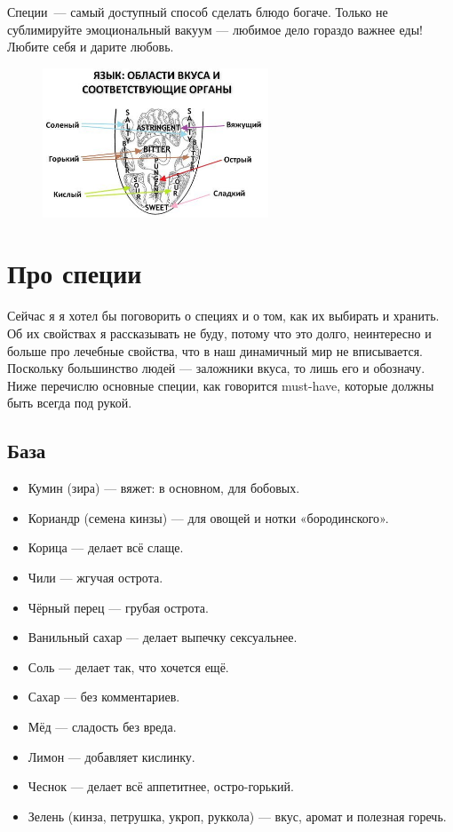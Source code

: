 Специи~--- самый доступный способ сделать блюдо богаче. Только не сублимируйте эмоциональный вакуум — любимое дело гораздо важнее еды! Любите себя и дарите любовь.


\begin{figure}[ht]
    \centering
    \includegraphics[width=0.6\textwidth]{img/SixTastes}
    \label{fig:1}
\end{figure} 

\section{Про специи}
Сейчас я я хотел бы поговорить о специях и о том, как их выбирать и хранить. Об их свойствах я рассказывать не буду, потому что это долго, неинтересно и больше про лечебные свойства, что в наш динамичный мир не вписывается. Поскольку большинство людей — заложники вкуса, то лишь его и обозначу. Ниже перечислю основные специи, как говорится must-have, которые должны быть всегда под рукой.

\subsection{База}
\begin{itemize}
\item Кумин (зира) — вяжет: в основном, для бобовых.
\item Кориандр (семена кинзы) — для овощей и нотки «бородинского».
\item Корица — делает всё слаще.
\item Чили — жгучая острота.
\item Чёрный перец — грубая острота.
\item Ванильный сахар — делает выпечку сексуальнее.
\item Соль — делает так, что хочется ещё.
\item Сахар — без комментариев.
\item Мёд — сладость без вреда.
\item Лимон — добавляет кислинку.
\item Чеснок — делает всё аппетитнее, остро-горький.
\item Зелень (кинза, петрушка, укроп, руккола) — вкус, аромат и полезная горечь.
\end{itemize}

